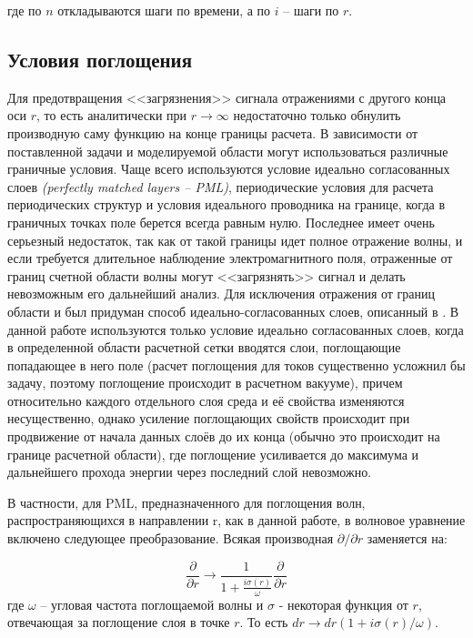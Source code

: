\documentclass[a4paper]{article}
\begin{document}
где по $n$ откладываются шаги по времени, а по $i$ -- шаги по $r$.
\newpage
\subsection{Условия поглощения}

Для предотвращения <<загрязнения>> сигнала отражениями с другого конца оси $r$, то есть аналитически при $r\rightarrow\infty$ недостаточно только обнулить производную саму функцию на конце границы расчета. В зависимости от поставленной задачи и моделируемой области могут использоваться различные граничные условия. Чаще всего используются условие идеально согласованных слоев \textit{(perfectly matched layers -- PML)}, периодические условия для расчета периодических структур и условия идеального проводника на границе, когда в граничных
точках поле берется всегда равным нулю. Последнее имеет очень серьезный недостаток, так как от такой границы идет полное отражение волны, и если требуется длительное
наблюдение электромагнитного поля, отраженные от границ счетной области волны могут <<загрязнять>> сигнал и делать невозможным его дальнейший анализ. Для исключения отражения от границ области и был придуман способ идеально-согласованных слоев, описанный в \cite{fdtd_pml}. В данной работе используются только условие идеально согласованных слоев, когда в определенной области расчетной сетки вводятся слои, поглощающие попадающее в него поле (расчет поглощения для токов существенно усложнил бы задачу, поэтому поглощение происходит в расчетном вакууме), причем относительно каждого отдельного слоя среда и её свойства изменяются несущественно, однако усиление поглощающих свойств происходит при продвижение от начала данных слоёв до их конца (обычно это происходит на границе расчетной области), где поглощение усиливается до максимума и дальнейшего прохода энергии через последний слой невозможно.

В частности, для PML, предназначенного для поглощения волн, распространяющихся в направлении r, как в данной работе, в волновое уравнение включено следующее преобразование. Всякая производная  $\partial/\partial r$ заменяется на:

\begin{equation}
	\frac{\partial}{\partial r} \to \frac{1}{1 + \frac{i\sigma(r)}{\omega}} \frac{\partial}{\partial r}
\end{equation}
где $ \omega$ -- угловая частота поглощаемой волны и $\sigma$ - некоторая функция от $r$, отвечающая за поглощение слоя в точке $r$.  То есть $dr \to dr (1 + i\sigma(r)/\omega)$.
\end{document}
